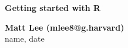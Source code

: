 \documentclass[svgnames,smaller]{beamer}\usepackage[]{graphicx}\usepackage[]{color}
\begin{document}
{
\begin{frame}
\begin{center}
\vspace{0cm}\large \textcolor{SteelBlue!95}{\textbf{Getting started with R}} \\

{\color{Snow}\hrulefill}

\vspace{0.5cm} \large  \textcolor{SteelBlue!95}{\textbf{Matt Lee (mlee8@g.harvard)}} \\
\textcolor{SteelBlue!95}{ name, date}
\end{center}
\end{frame}
}

\small
\end{document}
